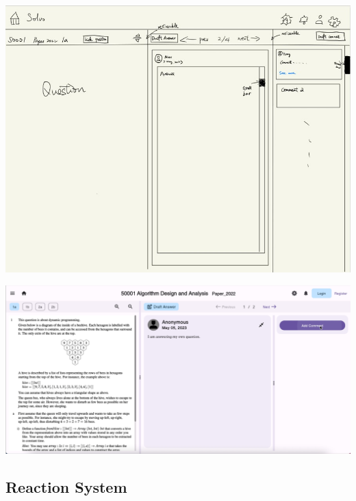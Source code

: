 \documentclass[a4paper]{article}
\begin{document}
    \noindent \begin{minipage}{0.4\textwidth}
        \centering
        \includegraphics[width=\textwidth]{concept1}
    \end{minipage}\hspace{0.05\textwidth}
    \begin{minipage}{0.57\textwidth}
        \centering
        \includegraphics[width=\textwidth]{question-page1}
    \end{minipage}

    \subsection*{Reaction System}
\end{document}
